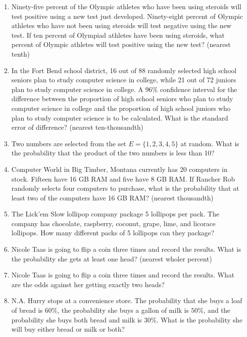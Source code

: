 \documentclass[../uilmath.tex]{subfiles}
\begin{document}
\begin{enumerate}[label=\bfseries\arabic*.]
    \item %
    Ninety-five percent of the Olympic athletes who have been using steroids will test positive using a new test just developed. Ninety-eight percent of Olympic athletes who have not been using steroids will test negative 
    using the new test. If ten percent of Olympiad athletes have been using steroids, what percent of Olympic athletes will test positive using the new test? (nearest tenth)

    \item %
    In the Fort Bend school district, 16 out of 88 randomly selected high school seniors plan to study computer science in college, while 21 out of 72 juniors plan to study computer science in college.
    A 96\% confidence interval for the difference between the proportion of high school seniors who plan to study computer science in college and the proportion of high school juniors who plan to study computer science is to be calculated.
    What is the standard error of difference? (nearest ten-thousandth)

    \item %
    Two numbers are selected from the set $E=\{1,2,3,4,5\}$ at random. What is the probability that the product of the two numbers is less than 10?

    \item %
    Computer World in Big Timber, Montana currently has 20 computers in stock. Fifteen have 16 GB RAM and five have 8 GB RAM. If Rancher Rob randomly selects four computers to purchase, what is the probability that at least two of the computers have 16 GB RAM? (nearest thousandth)

    \item %
    The Lick'em Slow lollipop company package 5 lollipops per pack. The company has chocolate, raspberry, coconut, grape, lime, and licorace lollipops. How many different packs of 5 lollipops can they package?

    \item %
    Nicole Taas is going to flip a coin three times and record the results. What is the probability she gets at least one head? (nearest wholer percent)

    \item %
    Nicole Taas is going to flip a coin three times and record the results. What are the odds against her getting exactly two heads?

    \item %
    N.A. Hurry stops at a convenience store. The probability that she buys a loaf of bread is $60\%$, the probability she buys a gallon of milk is $50\%$, and the probability she buys both bread and milk is $30\%$. What is 
    the probability she will buy either bread or milk or both?


\end{enumerate}
\end{document}

